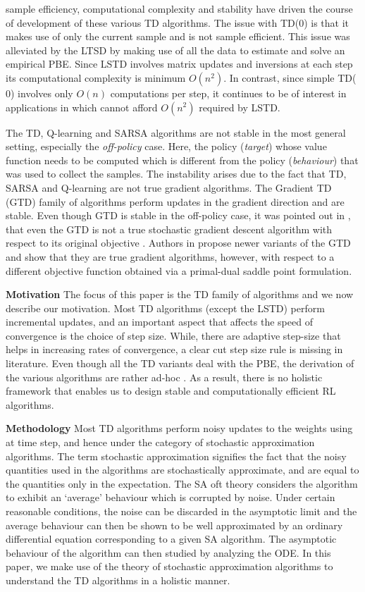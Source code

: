 sample efficiency, computational complexity and stability have driven the course of development of these various TD algorithms. The issue with TD($0$) is that it makes use of only the current sample and is not sample efficient. This issue was alleviated by the LTSD by making use of all the data to estimate and solve an empirical PBE. Since LSTD involves matrix updates and inversions at each step its computational complexity is minimum $O(n^2)$. In contrast, since simple TD($0$) involves only $O(n)$ computations per step, it continues to be of interest in applications in which cannot afford $O(n^2)$ required by LSTD.\par
The TD, Q-learning and SARSA algorithms are not stable in the most general setting, especially the \emph{off-policy} case. Here, the policy (\emph{target}) whose value function needs to be  computed which is different from the policy (\emph{behaviour}) that was used to collect the samples. The instability arises due to the fact that TD, SARSA and Q-learning are not true gradient algorithms. The Gradient TD (GTD) family of algorithms perform updates in the gradient direction and are stable. Even though GTD is stable in the off-policy case, it was pointed out in \cite{}, that even the GTD is not a true stochastic gradient descent algorithm with respect to its original objective \cite{}. Authors in \cite{} propose newer variants of the GTD and show that they are true gradient algorithms, however, with respect to a different objective function obtained via a primal-dual saddle point formulation.\par
\textbf{Motivation} The focus of this paper is the TD family of algorithms and we now describe our motivation. Most TD algorithms (except the LSTD) perform incremental updates, and an important aspect that affects the speed of convergence is the choice of step size. While, there are adaptive step-size that helps in increasing rates of convergence, a clear cut step size rule is missing in literature. Even though all the TD variants deal with the PBE, the derivation of the various algorithms are rather ad-hoc \cite{}. As a result, there is no holistic framework that enables us to design stable and computationally efficient RL algorithms.\par
\textbf{Methodology} Most TD algorithms perform noisy updates to the weights using at time step, and hence under the category of stochastic approximation algorithms. The term stochastic approximation signifies the fact that the noisy quantities used in the algorithms are stochastically approximate, and are equal to the quantities only in the expectation. The SA oft theory considers the algorithm to exhibit an `average’ behaviour which is corrupted by noise. Under certain reasonable conditions, the noise can be discarded in the asymptotic limit and the average behaviour can then be shown to be well approximated by an ordinary differential equation corresponding to a given SA algorithm. The asymptotic behaviour of the algorithm can then studied by analyzing the ODE. In this paper, we make use of the theory of stochastic approximation algorithms to understand the TD algorithms in a holistic manner.\par
